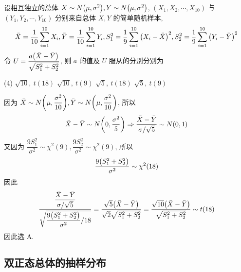 \begin{example}
    设相互独立的总体 $X\sim N\qty(\mu,\sigma^2),Y\sim N\qty(\mu,\sigma^2)$, $(X_1, X_2, \cdots ,X_{10})$ 与 $(Y_1, Y_2, \cdots ,Y_{10})$ 分别来自总体 $X,Y$ 的简单随机样本,
    $$
    \bar{X}=\dfrac{1}{10}\sum_{i=1}^{10} X_i, \bar{Y}=\dfrac{1}{10}\sum_{i=1}^{10} Y_i, S_1^2=\dfrac{1}{9}\sum_{i=1}^{10} \qty(X_i-\bar{X})^2,S_2^2=\dfrac{1}{9}\sum_{i=1}^{10} \qty(Y_i-\bar{Y})^2
    $$
    令 $U=\dfrac{a\qty(\bar{X}-\bar{Y})}{\sqrt{S_1^2+S_2^2}}$, 则 $a$ 的值及 $U$ 服从的分别分别为 
    \begin{tasks}(4)
        \task $\sqrt{10},~t(18)$
        \task $\sqrt{10},~t(9)$
        \task $\sqrt{5},~t(18)$
        \task $\sqrt{5},~t(9)$
    \end{tasks}
\end{example}
\begin{solution}
    因为 $\bar{X}\sim N\qty(\mu,\dfrac{\sigma^2}{10}),\bar{Y}\sim N\qty(\mu,\dfrac{\sigma^2}{10})$, 所以 $$
    \bar{X}-\bar{Y}\sim N\qty(0,\dfrac{\sigma^2}{5})\Rightarrow \dfrac{\bar{X}-\bar{Y}}{\sigma /\sqrt{5}}\sim N(0,1)
    $$
    又因为 $\dfrac{9S_1^2}{\sigma^2}\sim \chi^2(9),\dfrac{9S_2^2}{\sigma^2}\sim \chi^2(9)$, 所以 $$
    \dfrac{9\qty(S_1^2+S_2^2)}{\sigma^2}\sim \chi^2(18)
    $$
    因此 $$
    \dfrac{\dfrac{\bar{X}-\bar{Y}}{\sigma /\sqrt{ 5}}}{\sqrt{\dfrac{9\qty(S_1^2+S_2^2)}{\sigma^2}/18} }=\dfrac{\sqrt{5}\qty(\bar{X}-\bar{Y})}{\sqrt{2}\sqrt{S_1^2+S_2^2}}=\dfrac{\sqrt{10}\qty(\bar{X}-\bar{Y})}{\sqrt{S_1^2+S_2^2}}\sim t(18)
    $$
    因此选 A.
\end{solution}

\subsection{双正态总体的抽样分布}

